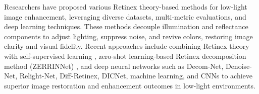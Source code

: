 Researchers have proposed various Retinex theory-based methods for low-light image enhancement, leveraging diverse datasets, multi-metric evaluations, and deep learning techniques. These methods decouple illumination and reflectance components to adjust lighting, suppress noise, and revive colors, restoring image clarity and visual fidelity. Recent approaches include combining Retinex theory with self-supervised learning \cite{wang2021seeing,rasheed2022empirical,fu2023learning}, zero-shot learning-based Retinex decomposition method (ZERRINNet) \cite{li2023zero}, and deep neural networks such as Decom-Net, Denoise-Net, Relight-Net, Diff-Retinex, DICNet, machine learning, and CNNs \cite{hai2023r2rnet,yi2023diff,li2024dark,pan2024dicnet} to achieve superior image restoration and enhancement outcomes in low-light environments.